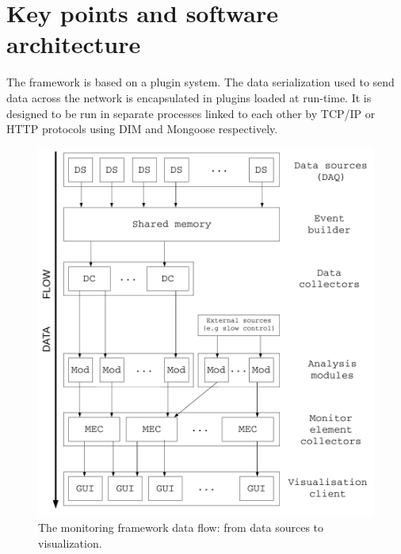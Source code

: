 \documentclass[conference]{IEEEtran}
\begin{document}
\section{Key points and software architecture}

The framework is based on a plugin system. The data serialization used to send data across the network is encapsulated in plugins loaded at run-time. It is designed to be run in separate processes linked to each other by TCP/IP or HTTP protocols using DIM\cite{DIM} and Mongoose\cite{MONGOOSE} respectively.

\begin{figure}[htbp]
  \begin{center}
    \includegraphics[width=0.8\linewidth]{DQMWorkflow.pdf}
    \caption{\label{DQM_WORKFLOW}The monitoring framework data flow: from data sources to visualization.}
  \end{center}
  \vspace{-.95cm}
\end{figure}
\end{document}
